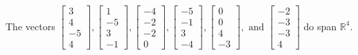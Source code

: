\begin{exercise}
\begin{exerciseStatement}
  \end{exerciseStatement}
  \begin{exerciseAnswer}
   The vectors \(\left[\begin{array}{r}
3 \\
4 \\
-5 \\
4
\end{array}\right] , \left[\begin{array}{r}
1 \\
-5 \\
3 \\
-1
\end{array}\right] , \left[\begin{array}{r}
-4 \\
-2 \\
-2 \\
0
\end{array}\right] , \left[\begin{array}{r}
-5 \\
-1 \\
3 \\
-4
\end{array}\right] , \left[\begin{array}{r}
0 \\
0 \\
4 \\
-3
\end{array}\right] , \text{ and } \left[\begin{array}{r}
-2 \\
-3 \\
-3 \\
4
\end{array}\right]\) 
  	 do  
	span \(\mathbb{R}^4\).
  


  \end{exerciseAnswer}
\end{exercise}